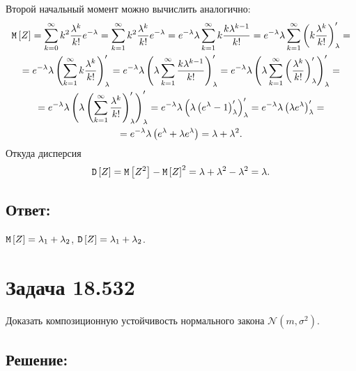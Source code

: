 Второй начальный момент можно вычислить аналогично:
\begin{multline}
    \mathtt{M} \left [ Z \right ]
    = \sum_{k=0}^{\infty} k^2 \frac{\lambda^k}{k!} e^{-\lambda}
    = \sum_{k=1}^{\infty} k^2 \frac{\lambda^k}{k!} e^{-\lambda}
    = e^{-\lambda} \lambda \sum_{k=1}^{\infty} k \frac{k \lambda^{k-1}}{k!}
    = e^{-\lambda} \lambda \sum_{k=1}^{\infty} \left ( k \frac{\lambda^k}{k!} \right )_{\lambda}^{\prime} = \\
    = e^{-\lambda} \lambda \left ( \sum_{k=1}^{\infty} k \frac{\lambda^k}{k!} \right )_{\lambda}^{\prime}
    = e^{-\lambda} \lambda \left ( \lambda \sum_{k=1}^{\infty} \frac{k \lambda^{k-1}}{k!} \right )_{\lambda}^{\prime}
    = e^{-\lambda} \lambda \left ( \lambda \sum_{k=1}^{\infty} \left ( \frac{\lambda^{k}}{k!} \right )_{\lambda}^{\prime} \right )_{\lambda}^{\prime} = \\
    = e^{-\lambda} \lambda \left ( \lambda \left ( \sum_{k=1}^{\infty} \frac{\lambda^{k}}{k!} \right )_{\lambda}^{\prime} \right )_{\lambda}^{\prime}
    = e^{-\lambda} \lambda \left ( \lambda \left ( e^\lambda - 1 \right )_{\lambda}^{\prime} \right )_{\lambda}^{\prime}
    = e^{-\lambda} \lambda \left ( \lambda e^\lambda \right )_{\lambda}^{\prime} = \\
    = e^{-\lambda} \lambda \left ( e^\lambda + \lambda e^\lambda \right )
    = \lambda + \lambda^2.
\end{multline}
Откуда дисперсия
\begin{equation}
    \mathtt{D} \left [ Z \right ]
    = \mathtt{M} \left [ Z^2 \right ] - \mathtt{M} \left [ Z \right ]^2
    = \lambda + \lambda^2 - \lambda^2
    = \lambda.
\end{equation}

\subsection*{Ответ:}
$\mathtt{M} \left [ Z \right ] = \lambda_1 + \lambda_2$, $\mathtt{D} \left [ Z \right ] = \lambda_1 + \lambda_2$.

\section*{Задача 18.532}

Доказать композиционную устойчивость нормального закона $\mathcal{N} \left ( m, \sigma^2 \right )$.

\subsection*{Решение:}

